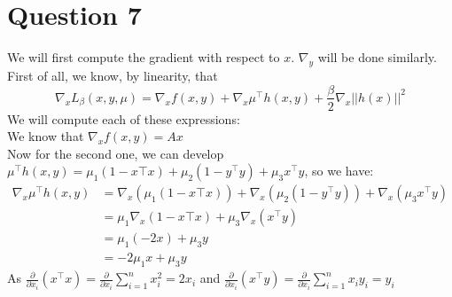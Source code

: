 \documentclass{article}
\newcommand{\R}{\mathbb{R}}
\newcommand{\tp}{^\top}
\newcommand{\p}{\frac{\partial}{\partial x_i}}
\begin{document}
\begin{comment}
So we may take $(x^*,  y^*) = (v_{\min }(A), v_{\min} (B))$, where $v_{\min }(A)$ and $v_{\min }(B)$ are the unit-normed eigenvectors of $\lambda_{\min}(A)$ and $\lambda_{\max}(B)$ respectively. \\
At this point, we need to recall that $(x^*,y^*)$ must belong to the set $S$, or equivalently we must have $h(x^*,y^*)=0$. By taking unit-normed eigenvectors, we ensure that $h_1(x^*,y^*)=0=h_2(x^*,y^*)$. The last condition is $h_3(x^*,y^*) = 0$. By definition of $h_3$, this means $(x^*)\tp y^* = 0$, i.e. $x^*$ and $y^*$ need to be orthogonal in $\R^n$. This is the only assumption we do not know, but observe that as soon as we know it the previous reasoning implies that the assumptions of the strong duality theorem are satisfied.\\

Hence, we can always find $\mu^*\in\R^3$ such that $(\text{A}2)$ is satisfied, but we cannot always ensure that $(\text{A}1)$ is satisfied. One condition that can ensure it however, is that the eigenvectors of $A$ and $B$ corresponding to their smallest eigenvalues are orthogonal. We can not expect to have this before solving the problem if we don't have specific informations about $A$ and $B$ other that them being symmetric.
\end{comment}



\section*{Question 7}


We will first compute the gradient with respect to $x$. $\nabla_y$ will be done similarly.\\
First of all, we know, by linearity, that 
$$\nabla_x L_{\beta}(x,y,\mu)=\nabla_x f(x,y) + \nabla_x \mu\tp h(x,y)+ \frac{\beta}{2} \nabla_x ||h(x)||^2$$
We will compute each of these expressions:\\

We know that $\nabla_x f(x,y)= Ax$\\

Now for the second one, we can develop $\mu\tp h(x,y)=\mu_1 (1-x\top x)+\mu_2(1-y\tp y) + \mu_3 x\tp y$, so we have:
\begin{align*}
\nabla_x \mu\tp h(x,y)&=\nabla_x (\mu_1 (1-x\top x))+\nabla_x (\mu_2(1-y\tp y)) +\nabla_x ( \mu_3 x\tp y)\\
&=\mu_1 \nabla_x (1-x\top x) + \mu_3 \nabla_x ( x\tp y)\\
&= \mu_1 (-2x) + \mu_3 y\\
&= - 2\mu_1 x+\mu_3 y
\end{align*}
As $\p(x\tp x)=\p \sum_{i=1}^n x_i^2=2x_i$ and  $\p(x\tp y)=\p \sum_{i=1}^n x_i y_i=y_i$\\
\end{document}
